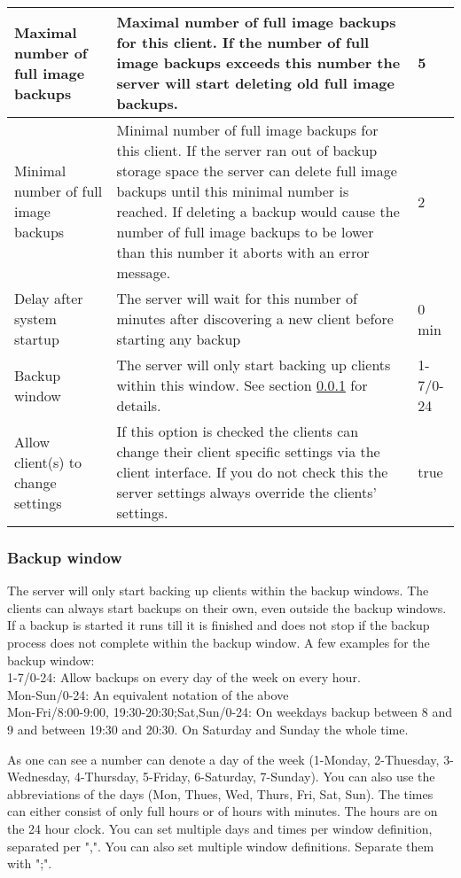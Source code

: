 \documentclass[a4paper,10pt]{article}
\begin{document}
\begin{longtable}{|p{}|p{}|p{}|}
\hline
Maximal number of full image backups & Maximal number of full image backups for this client. If the number of
 full image backups exceeds this number the server will start deleting old full image backups. & 5\\
\hline
Minimal number of full image backups & Minimal number of full image backups for this client. If the server ran out of backup storage space the server can delete full image backups until this minimal number is reached. If deleting a backup would cause the number of full image backups to be lower than this number it aborts with an error message. & 2\\
\hline
Delay after system startup & The server will wait for this number of minutes after discovering a new client before starting any backup & 0 min\\
\hline
Backup window & The server will only start backing up clients within this window. See section \ref{subsub_backup_window} for details. & 1-7/0-24\\
\hline
Allow client(s) to change settings & If this option is checked the clients can change their client specific settings via the client interface. If you do not check this the server settings always override the clients' settings. & true\\
\hline
\end{longtable}

\subsubsection{Backup window}
\label{subsub_backup_window}

The server will only start backing up clients within the backup windows. The clients can always start backups on their own, even outside the backup windows. If a backup is started it runs till it is finished and does not stop if the backup process does not complete within the backup window. A few examples for the backup window:\\
1-7/0-24: Allow backups on every day of the week on every hour.\\
Mon-Sun/0-24: An equivalent notation of the above\\
Mon-Fri/8:00-9:00, 19:30-20:30;Sat,Sun/0-24: On weekdays backup between 8 and 9 and between 19:30 and 20:30. On Saturday and Sunday the whole time.

As one can see a number can denote a day of the week (1-Monday, 2-Thuesday, 3-Wednesday, 4-Thursday, 5-Friday, 6-Saturday, 7-Sunday). You can also use the abbreviations of the days (Mon, Thues, Wed, Thurs, Fri, Sat, Sun). The times can either consist of only full hours or of hours with minutes. The hours are on the 24 hour clock. You can set multiple days and times per window definition, separated per ",". You can also set multiple window definitions. Separate them with ";".
\end{document}
